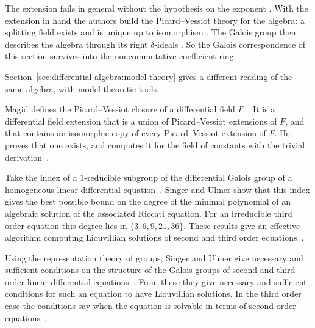 The extension fails in general without the hypothesis on the exponent
\cite[p.~2]{MichelSrinivasan2026}. With the extension in hand the authors
build the Picard--Vessiot theory for the algebra: a splitting field exists
and is unique up to isomorphism \cite[p.~1]{MichelSrinivasan2026}. The
Galois group then describes the algebra through its right $\delta$-ideals
\cite[p.~1]{MichelSrinivasan2026}. So the Galois correspondence of this
section survives into the noncommutative coefficient ring.

Section~\ref{sec:differential-algebra:model-theory}
gives a different reading of the same algebra, with model-theoretic
tools.


Magid defines the Picard--Vessiot closure of a differential field $F$~\cite{WlThePicardVessiotClosureInDiffe2002}. It is a
differential field extension that is a union of Picard--Vessiot extensions of
$F$, and that contains an isomorphic copy of every Picard--Vessiot extension
of $F$. He proves that one exists, and computes it for the field of constants
with the trivial derivation~\cite{WlThePicardVessiotClosureInDiffe2002}.

Take the index of a $1$-reducible subgroup of the differential Galois group of
a homogeneous linear differential equation~\cite{WlLiouvillianAndAlgebraicSolutio1993}. Singer and Ulmer show that this
index gives the best possible bound on the degree of the minimal polynomial of
an algebraic solution of the associated Riccati equation. For an irreducible
third order equation this degree lies in $\{3,6,9,21,36\}$. These results give
an effective algorithm computing Liouvillian solutions of second and third
order equations~\cite{WlLiouvillianAndAlgebraicSolutio1993}.

Using the representation theory of groups, Singer and Ulmer give necessary and
sufficient conditions on the structure of the Galois groups of second and
third order linear differential equations~\cite{WlGaloisGroupsOfSecondAndThirdOr1993}. From these they give necessary and
sufficient conditions for such an equation to have Liouvillian solutions. In %
the third order case the conditions say when the equation is solvable in terms
of second order equations~\cite{WlGaloisGroupsOfSecondAndThirdOr1993}.

